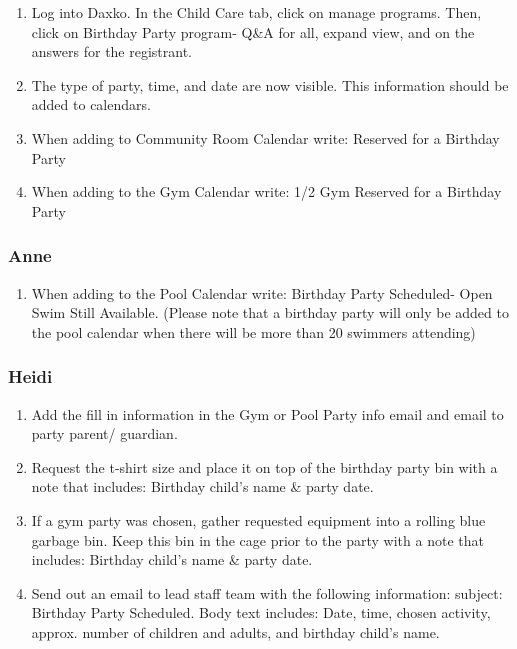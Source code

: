 \documentclass[
]{report}
\providecommand{\tightlist}{%
  \setlength{\itemsep}{0pt}\setlength{\parskip}{0pt}}\usepackage{longtable,booktabs,array}
\begin{document}
\begin{enumerate}
\def\labelenumi{\arabic{enumi}.}
\setcounter{enumi}{2}
\item
  Log into Daxko. In the Child Care tab, click on manage programs. Then,
  click on Birthday Party program- Q\&A for all, expand view, and on the
  answers for the registrant.
\item
  The type of party, time, and date are now visible. This information
  should be added to calendars.
\item
  When adding to Community Room Calendar write: Reserved for a Birthday
  Party
\item
  When adding to the Gym Calendar write: 1/2 Gym Reserved for a Birthday
  Party
\end{enumerate}

\hypertarget{anne}{%
\subsubsection{Anne}\label{anne}}

\begin{enumerate}
\def\labelenumi{\arabic{enumi}.}
\setcounter{enumi}{6}
\tightlist
\item
  When adding to the Pool Calendar write: Birthday Party Scheduled- Open
  Swim Still Available. (Please note that a birthday party will only be
  added to the pool calendar when there will be more than 20 swimmers
  attending)
\end{enumerate}

\hypertarget{heidi-1}{%
\subsubsection{Heidi}\label{heidi-1}}

\begin{enumerate}
\def\labelenumi{\arabic{enumi}.}
\setcounter{enumi}{7}
\item
  Add the fill in information in the Gym or Pool Party info email and
  email to party parent/ guardian.
\item
  Request the t-shirt size and place it on top of the birthday party bin
  with a note that includes: Birthday child's name \& party date.
\item
  If a gym party was chosen, gather requested equipment into a rolling
  blue garbage bin. Keep this bin in the cage prior to the party with a
  note that includes: Birthday child's name \& party date.
\item
  Send out an email to lead staff team with the following information:
  subject: Birthday Party Scheduled. Body text includes: Date, time,
  chosen activity, approx. number of children and adults, and birthday
  child's name.
\end{enumerate}
\end{document}
